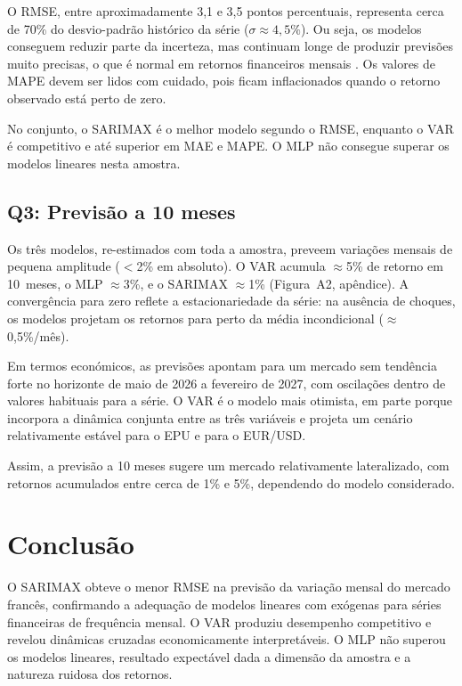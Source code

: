 \documentclass[12pt,a4paper]{article}
\begin{document}
O RMSE, entre aproximadamente 3,1 e 3,5 pontos percentuais, representa cerca de 70\% do desvio-padrão histórico da série ($\sigma \approx 4{,}5\%$). Ou seja, os modelos conseguem reduzir parte da incerteza, mas continuam longe de produzir previsões muito precisas, o que é normal em retornos financeiros mensais \citep{fama1970efficient}. Os valores de MAPE devem ser lidos com cuidado, pois ficam inflacionados quando o retorno observado está perto de zero.

No conjunto, o SARIMAX é o melhor modelo segundo o RMSE, enquanto o VAR é competitivo e até superior em MAE e MAPE. O MLP não consegue superar os modelos lineares nesta amostra.

\subsection*{Q3: Previsão a 10 meses}

Os três modelos, re-estimados com toda a amostra, preveem variações mensais de pequena amplitude ($<$2\% em absoluto). O VAR acumula $\approx$5\% de retorno em 10~meses, o MLP $\approx$3\%, e o SARIMAX $\approx$1\% (Figura~A2, apêndice). A convergência para zero reflete a estacionariedade da série: na ausência de choques, os modelos projetam os retornos para perto da média incondicional ($\approx$0,5\%/mês).

Em termos económicos, as previsões apontam para um mercado sem tendência forte no horizonte de maio de 2026 a fevereiro de 2027, com oscilações dentro de valores habituais para a série. O VAR é o modelo mais otimista, em parte porque incorpora a dinâmica conjunta entre as três variáveis e projeta um cenário relativamente estável para o EPU e para o EUR/USD.

Assim, a previsão a 10 meses sugere um mercado relativamente lateralizado, com retornos acumulados entre cerca de 1\% e 5\%, dependendo do modelo considerado.

\section{Conclusão}

O SARIMAX obteve o menor RMSE na previsão da variação mensal do mercado francês, confirmando a adequação de modelos lineares com exógenas para séries financeiras de frequência mensal. O VAR produziu desempenho competitivo e revelou dinâmicas cruzadas economicamente interpretáveis. O MLP não superou os modelos lineares, resultado expectável dada a dimensão da amostra e a natureza ruidosa dos retornos.
\end{document}
